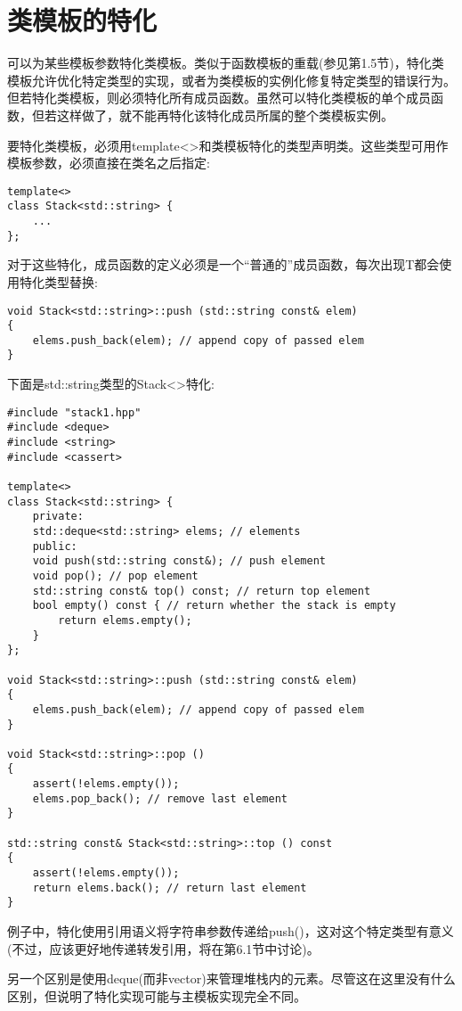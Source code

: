 \section{类模板的特化}

可以为某些模板参数特化类模板。类似于函数模板的重载(参见第1.5节)，特化类模板允许优化特定类型的实现，或者为类模板的实例化修复特定类型的错误行为。但若特化类模板，则必须特化所有成员函数。虽然可以特化类模板的单个成员函数，但若这样做了，就不能再特化该特化成员所属的整个类模板实例。

要特化类模板，必须用template<>和类模板特化的类型声明类。这些类型可用作模板参数，必须直接在类名之后指定:

\begin{lstlisting}[style=styleCXX]
template<>
class Stack<std::string> {
	...
};
\end{lstlisting}

对于这些特化，成员函数的定义必须是一个“普通的”成员函数，每次出现T都会使用特化类型替换:

\begin{lstlisting}[style=styleCXX]
void Stack<std::string>::push (std::string const& elem)
{
	elems.push_back(elem); // append copy of passed elem
}
\end{lstlisting}

下面是std::string类型的Stack<>特化:

\begin{lstlisting}[style=styleCXX]
#include "stack1.hpp"
#include <deque>
#include <string>
#include <cassert>

template<>
class Stack<std::string> {
	private:
	std::deque<std::string> elems; // elements
	public:
	void push(std::string const&); // push element
	void pop(); // pop element
	std::string const& top() const; // return top element
	bool empty() const { // return whether the stack is empty
		return elems.empty();
	}
};

void Stack<std::string>::push (std::string const& elem)
{
	elems.push_back(elem); // append copy of passed elem
}

void Stack<std::string>::pop ()
{
	assert(!elems.empty());
	elems.pop_back(); // remove last element
}

std::string const& Stack<std::string>::top () const
{
	assert(!elems.empty());
	return elems.back(); // return last element
}
\end{lstlisting}

例子中，特化使用引用语义将字符串参数传递给push()，这对这个特定类型有意义(不过，应该更好地传递转发引用，将在第6.1节中讨论)。

另一个区别是使用deque(而非vector)来管理堆栈内的元素。尽管这在这里没有什么区别，但说明了特化实现可能与主模板实现完全不同。






















